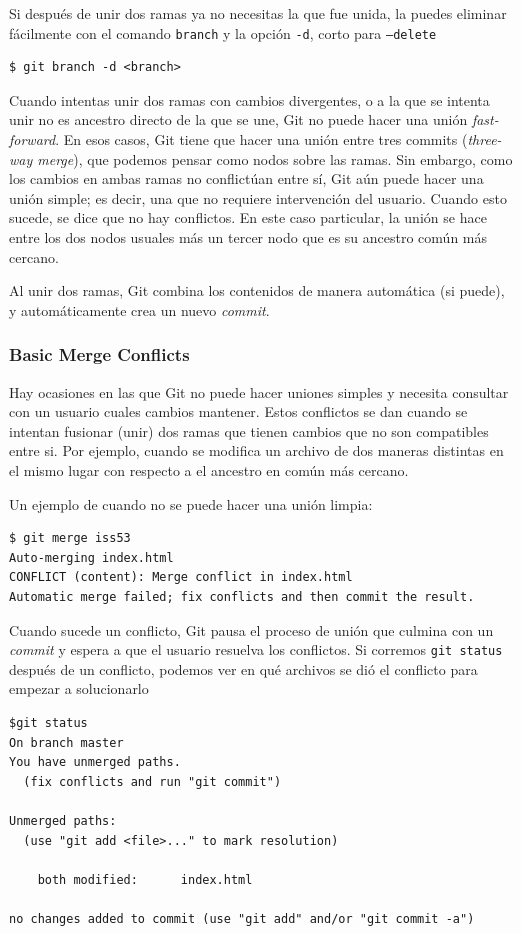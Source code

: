 \documentclass[spanish, 12pt, a4paper]{article}
\begin{document}
Si después de unir dos ramas ya no necesitas la que fue unida, la puedes eliminar fácilmente con el comando \texttt{branch} y la opción \texttt{-d}, corto para \texttt{--delete} 
\begin{lstlisting}
$ git branch -d <branch>
\end{lstlisting}

Cuando intentas unir dos ramas con cambios divergentes, o a la que se intenta unir no es ancestro directo de la que se une, Git no puede hacer una unión \textit{fast-forward}.
En esos casos, Git tiene que hacer una unión entre tres commits (\textit{three-way merge}), que podemos pensar como nodos sobre las ramas.
Sin embargo, como los cambios en ambas ramas no conflictúan entre sí, Git aún puede hacer una unión simple; es decir, una que no requiere intervención del usuario.
Cuando esto sucede, se dice que no hay conflictos.
En este caso particular, la unión se hace entre los dos nodos usuales más un tercer nodo que es su ancestro común más cercano.

Al unir dos ramas, Git combina los contenidos de manera automática (si puede), y automáticamente crea un nuevo \textit{commit}.

\subsubsection{Basic Merge Conflicts}
Hay ocasiones en las que Git no puede hacer uniones simples y necesita consultar con un usuario cuales cambios mantener.
Estos conflictos se dan cuando se intentan fusionar (unir) dos ramas que tienen cambios que no son compatibles entre si.
Por ejemplo, cuando se modifica un archivo de dos maneras distintas en el mismo lugar con respecto a el ancestro en común más cercano.

Un ejemplo de cuando no se puede hacer una unión limpia:
\begin{lstlisting}
$ git merge iss53
Auto-merging index.html
CONFLICT (content): Merge conflict in index.html
Automatic merge failed; fix conflicts and then commit the result.
\end{lstlisting}

Cuando sucede un conflicto, Git pausa el proceso de unión que culmina con un \textit{commit} y espera a que el usuario resuelva los conflictos.
Si corremos \texttt{git status} después de un conflicto, podemos ver en qué archivos se dió el conflicto para empezar a solucionarlo
\begin{lstlisting}
$git status
On branch master
You have unmerged paths.
  (fix conflicts and run "git commit")

Unmerged paths:
  (use "git add <file>..." to mark resolution)

    both modified:      index.html

no changes added to commit (use "git add" and/or "git commit -a")
\end{lstlisting}
\end{document}
